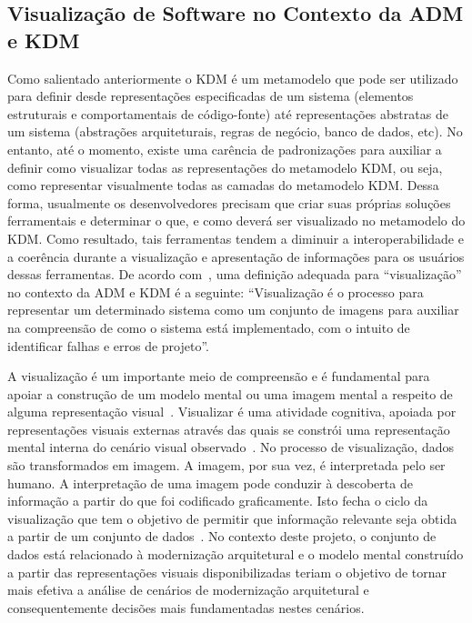 \documentclass[12pt]{article}
\begin{document}
\subsection{Visualização de Software no Contexto da ADM e KDM}

Como salientado anteriormente o KDM é um metamodelo que pode ser utilizado para definir desde representações especificadas de um sistema (elementos estruturais e comportamentais de código-fonte) até representações abstratas de um sistema (abstrações arquiteturais, regras de negócio, banco de dados, etc). No entanto, até o momento, existe uma carência de padronizações para auxiliar a definir como visualizar todas as representações do metamodelo KDM, ou seja, como representar visualmente todas as camadas do metamodelo KDM. Dessa forma, usualmente os desenvolvedores precisam que criar suas próprias soluções ferramentais e determinar o que, e como deverá ser visualizado no metamodelo do KDM. Como resultado, tais ferramentas tendem a diminuir a interoperabilidade e a coerência durante a visualização e apresentação de informações para os usuários dessas ferramentas. De acordo com~\cite{ADM:OMG}, uma definição adequada para ``visualização'' no contexto da ADM e KDM é a seguinte: ``Visualização é o processo para representar um determinado sistema como um conjunto de imagens para auxiliar na compreensão de como o sistema está implementado, com o intuito de identificar falhas e erros de projeto''.

A visualização é um importante meio de compreensão e é fundamental para apoiar a construção de um modelo mental ou uma imagem mental a respeito de alguma representação visual~\cite{spence2014information}. Visualizar é uma atividade cognitiva, apoiada por representações visuais externas através das quais se constrói uma representação mental interna do cenário visual observado~\cite{spence2014information, ware2012information}. No processo de visualização, dados são transformados em imagem. A imagem, por sua vez, é interpretada pelo ser humano. A interpretação de uma imagem pode conduzir à descoberta de informação a partir do que foi codificado graficamente. Isto fecha o ciclo da visualização que tem o objetivo de permitir que informação relevante seja obtida a partir de um conjunto de dados~\cite{source_miner_glauco}. No contexto deste projeto, o conjunto de dados está relacionado à modernização arquitetural e o modelo mental construído a partir das representações visuais disponibilizadas teriam o objetivo de tornar mais efetiva a análise de cenários de modernização arquitetural e consequentemente decisões mais fundamentadas nestes cenários. 
\end{document}
